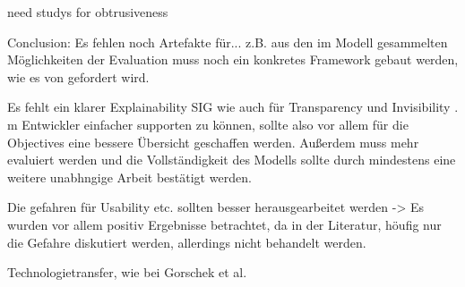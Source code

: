 need studys for obtrusiveness \cite{lim_2009_assessing}

Conclusion: Es fehlen noch Artefakte für... z.B. aus den im Modell gesammelten Möglichkeiten der Evaluation muss noch ein konkretes Framework gebaut werden, wie es von \citeauthor{sokol_explainability_2020} gefordert wird.

Es fehlt ein klarer Explainability SIG wie auch für Transparency \cite{do2010software} und Invisibility \cite{carvalho2020developers}. m Entwickler einfacher supporten zu können, sollte also vor allem für die Objectives eine bessere Übersicht geschaffen werden.
Außerdem muss mehr evaluiert werden und die Vollständigkeit des Modells sollte durch mindestens eine weitere unabhngige Arbeit bestätigt werden.

Die gefahren für Usability etc. sollten besser herausgearbeitet werden -> Es wurden vor allem positiv Ergebnisse betrachtet, da in der Literatur, höufig nur die Gefahre diskutiert werden, allerdings nicht behandelt werden.

Technologietransfer, wie bei Gorschek et al.

